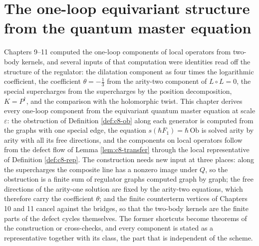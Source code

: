 \chapter{The one-loop equivariant structure from the quantum master equation}

Chapters 9--11 computed the one-loop components of local operators from two-body kernels, and several inputs of that computation were identities read off the structure of the regulator: the dilatation component as four times the logarithmic coefficient, the coefficient $\theta=-\tfrac13$ from the arity-two component of $L\circ L=0$, the special supercharges from the supercharges by the position decomposition, $K=P^\dagger$, and the comparison with the holomorphic twist. This chapter derives every one-loop component from the equivariant quantum master equation at scale $\varepsilon$: the obstruction of Definition \ref{def:c8-ob} along each generator is computed from the graphs with one special edge, the equation $s(\hbar F_1)=\hbar\,\mathrm{Ob}$ is solved arity by arity with all its free directions, and the components on local operators follow from the defect flow of Lemma \ref{lem:c8-transfer} through the local representative of Definition \ref{def:c8-rep}. The construction needs new input at three places: along the supercharges the composite line has a nonzero image under $Q$, so the obstruction is a finite sum of regulator graphs computed graph by graph; the free directions of the arity-one solution are fixed by the arity-two equations, which therefore carry the coefficient $\theta$; and the finite counterterm vertices of Chapters 10 and 11 cancel against the bridges, so that the two-body kernels are the finite parts of the defect cycles themselves. The former shortcuts become theorems of the construction or cross-checks, and every component is stated as a representative together with its class, the part that is independent of the scheme.

